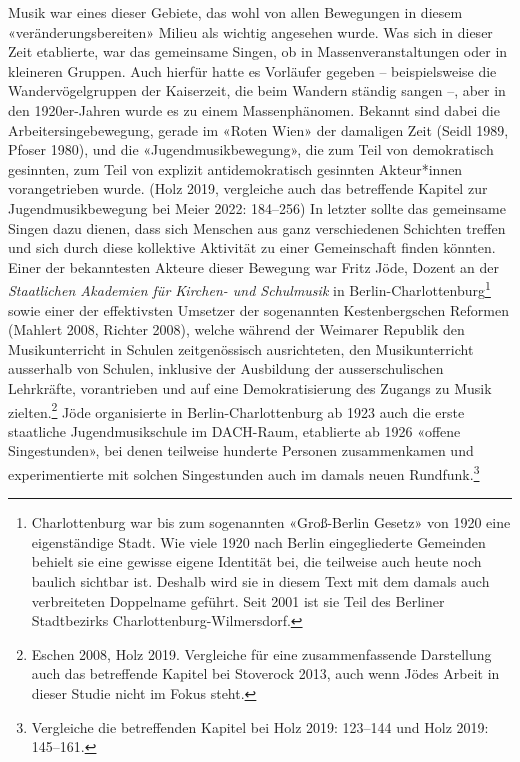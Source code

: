 \documentclass[a4paper,
fontsize=11pt,
oneside,
numbers=noperiodatend,
parskip=half-,
bibliography=totoc,
final
]{scrartcl}
\begin{document}
Musik war eines dieser Gebiete, das wohl von allen Bewegungen in diesem
«veränderungsbereiten» Milieu als wichtig angesehen wurde. Was sich in
dieser Zeit etablierte, war das gemeinsame Singen, ob in
Massenveranstaltungen oder in kleineren Gruppen. Auch hierfür hatte es
Vorläufer gegeben -- beispielsweise die Wandervögelgruppen der
Kaiserzeit, die beim Wandern ständig sangen --, aber in den
1920er-Jahren wurde es zu einem Massenphänomen. Bekannt sind dabei die
Arbeitersingebewegung, gerade im «Roten Wien» der damaligen Zeit (Seidl
1989, Pfoser 1980), und die «Jugendmusikbewegung», die zum Teil von
demokratisch gesinnten, zum Teil von explizit antidemokratisch gesinnten
Akteur*innen vorangetrieben wurde. (Holz 2019, vergleiche auch das
betreffende Kapitel zur Jugendmusikbewegung bei Meier 2022: 184--256) In
letzter sollte das gemeinsame Singen dazu dienen, dass sich Menschen aus
ganz verschiedenen Schichten treffen und sich durch diese kollektive
Aktivität zu einer Gemeinschaft finden könnten. Einer der bekanntesten
Akteure dieser Bewegung war Fritz Jöde, Dozent an der \emph{Staatlichen
Akademien für Kirchen- und Schulmusik} in
Berlin-Charlottenburg\footnote{Charlottenburg war bis zum sogenannten
  «Groß-Berlin Gesetz» von 1920 eine eigenständige Stadt. Wie viele 1920
  nach Berlin eingegliederte Gemeinden behielt sie eine gewisse eigene
  Identität bei, die teilweise auch heute noch baulich sichtbar ist.
  Deshalb wird sie in diesem Text mit dem damals auch verbreiteten
  Doppelname geführt. Seit 2001 ist sie Teil des Berliner Stadtbezirks
  Charlottenburg-Wilmersdorf.} sowie einer der effektivsten Umsetzer der
sogenannten Kestenbergschen Reformen (Mahlert 2008, Richter 2008),
welche während der Weimarer Republik den Musikunterricht in Schulen
zeitgenössisch ausrichteten, den Musikunterricht ausserhalb von Schulen,
inklusive der Ausbildung der ausserschulischen Lehrkräfte, vorantrieben
und auf eine Demokratisierung des Zugangs zu Musik zielten.\footnote{Eschen
  2008, Holz 2019. Vergleiche für eine zusammenfassende Darstellung auch
  das betreffende Kapitel bei Stoverock 2013, auch wenn Jödes Arbeit in
  dieser Studie nicht im Fokus steht.} Jöde organisierte in
Berlin-Charlottenburg ab 1923 auch die erste staatliche
Jugendmusikschule im DACH-Raum, etablierte ab 1926 «offene
Singestunden», bei denen teilweise hunderte Personen zusammenkamen und
experimentierte mit solchen Singestunden auch im damals neuen
Rundfunk.\footnote{Vergleiche die betreffenden Kapitel bei Holz 2019:
  123--144 und Holz 2019: 145--161.}
\end{document}
